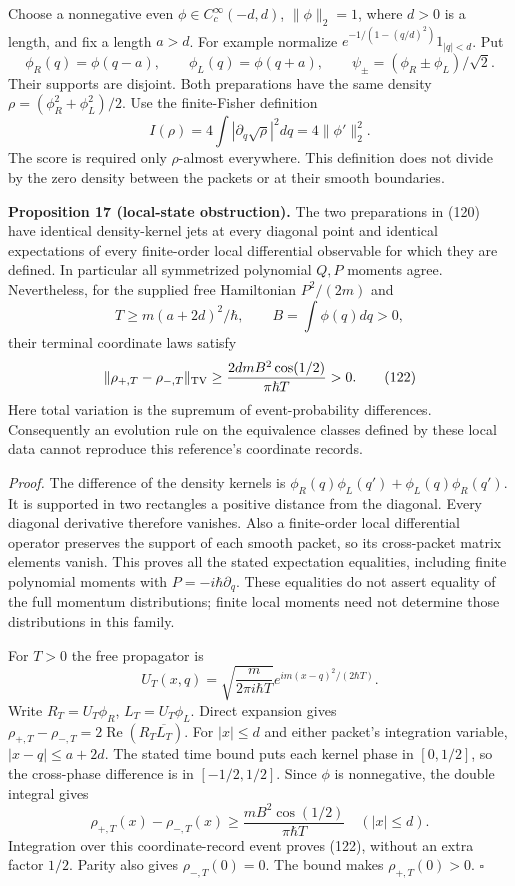 \documentclass[11pt,a4paper]{article}
\begin{document}
Choose a nonnegative even \(\phi\in C_c^\infty(-d,d)\),
\(\|\phi\|_2=1\), where \(d>0\) is a length, and fix a length \(a>d\).
For example normalize \(e^{-1/(1-(q/d)^2)}1_{|q|<d}\). Put
\[\phi_R(q)=\phi(q-a),\qquad \phi_L(q)=\phi(q+a),\qquad
\psi_\pm=(\phi_R\pm\phi_L)/\sqrt2.\tag{120}\] Their supports are
disjoint. Both preparations have the same density
\(\rho=(\phi_R^2+\phi_L^2)/2\). Use the finite-Fisher definition
\[I(\rho)=4\int|\partial_q\sqrt\rho|^2dq
 =4\|\phi'\|_2^2.\tag{121}\] The score is required only \(\rho\)-almost
everywhere. This definition does not divide by the zero density between
the packets or at their smooth boundaries.

\textbf{Proposition 17 (local-state obstruction).} The two preparations
in (120) have identical density-kernel jets at every diagonal point and
identical expectations of every finite-order local differential
observable for which they are defined. In particular all symmetrized
polynomial \(Q,P\) moments agree. Nevertheless, for the supplied free
Hamiltonian \(P^2/(2m)\) and
\[T\ge m(a+2d)^2/\hbar,\qquad B=\int\phi(q)dq>0,\] their terminal
coordinate laws satisfy \[\|\rho_{+,T}-\rho_{-,T}\|_{\rm TV}
 \ge\frac{2dmB^2\cos(1/2)}{\pi\hbar T}>0.\tag{122}\] Here total
variation is the supremum of event-probability differences. Consequently
an evolution rule on the equivalence classes defined by these local data
cannot reproduce this reference's coordinate records.

\emph{Proof.} The difference of the density kernels is
\(\phi_R(q)\phi_L(q')+\phi_L(q)\phi_R(q')\). It is supported in two
rectangles a positive distance from the diagonal. Every diagonal
derivative therefore vanishes. Also a finite-order local differential
operator preserves the support of each smooth packet, so its
cross-packet matrix elements vanish. This proves all the stated
expectation equalities, including finite polynomial moments with
\(P=-i\hbar\partial_q\). These equalities do not assert equality of the
full momentum distributions; finite local moments need not determine
those distributions in this family.

For \(T>0\) the free propagator is
\[U_T(x,q)=\sqrt{\frac{m}{2\pi i\hbar T}}
       e^{im(x-q)^2/(2\hbar T)}.\] Write \(R_T=U_T\phi_R\),
\(L_T=U_T\phi_L\). Direct expansion gives
\(\rho_{+,T}-\rho_{-,T}=2\operatorname{Re}(R_T\overline{L_T})\). For
\(|x|\le d\) and either packet's integration variable,
\(|x-q|\le a+2d\). The stated time bound puts each kernel phase in
\([0,1/2]\), so the cross-phase difference is in \([-1/2,1/2]\). Since
\(\phi\) is nonnegative, the double integral gives
\[\rho_{+,T}(x)-\rho_{-,T}(x)
 \ge\frac{mB^2\cos(1/2)}{\pi\hbar T}\quad(|x|\le d).\] Integration over
this coordinate-record event proves (122), without an extra factor
\(1/2\). Parity also gives \(\rho_{-,T}(0)=0\). The bound makes
\(\rho_{+,T}(0)>0\). \(\square\)
\end{document}
